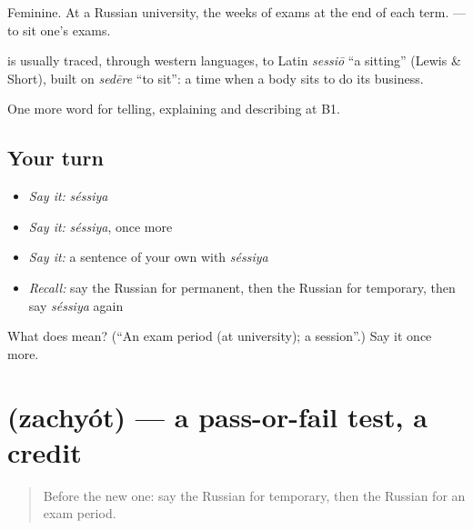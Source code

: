 Feminine. At a Russian university, the weeks of exams at the end of each term. \emph{ } — to sit one’s exams.

\begin{cousinweb}
\textbf{} is usually traced, through western languages, to Latin \emph{sessiō} \textquotedblleft{}a sitting\textquotedblright{} (Lewis \& Short), built on \emph{sedēre} \textquotedblleft{}to sit\textquotedblright{}: a time when a body sits to do its business.
\end{cousinweb}

\begin{grammarlens}[title={What you've built}]
One more word for telling, explaining and describing at B1.
\end{grammarlens}

\subsection*{Your turn}
\begin{itemize}
\raggedright
  \item \emph{Say it:} \emph{séssiya}
  \item \emph{Say it:} \emph{séssiya}, once more
  \item \emph{Say it:} a sentence of your own with \emph{séssiya}
  \item \emph{Recall:} say the Russian for permanent, then the Russian for temporary, then say \emph{séssiya} again
\end{itemize}

\begin{tcolorbox}[breakable,colback=teal!4,colframe=teal!35!black,title={Before you move on}]
What does  mean? (\textquotedblleft{}An exam period (at university); a session\textquotedblright{}.) Say it once more.
\end{tcolorbox}
\section[\texorpdfstring{\ru{зачёт} (zachyót)}{зачёт (zachyót)}]{ (zachyót) — a pass-or-fail test, a credit}

\label{lesson:RU-C381-zachyot}



\begin{quote}
Before the new one: say the Russian for temporary, then the Russian for an exam period.
\end{quote}

